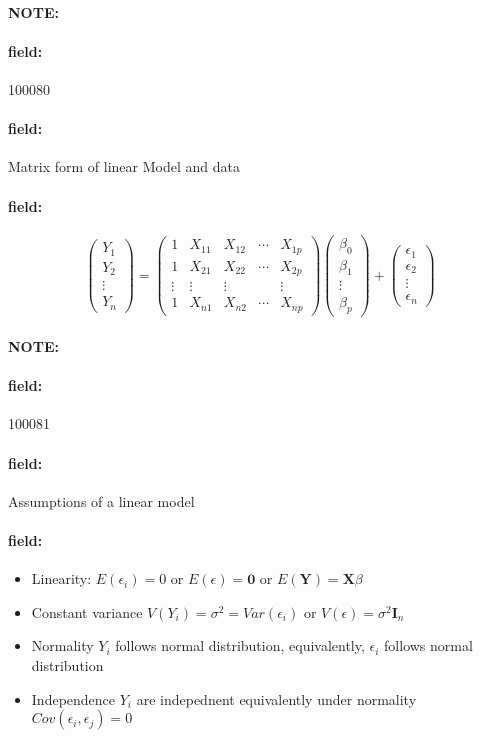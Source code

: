 \documentclass[12pt]{article}
\newenvironment{note}{\paragraph{NOTE:}}{}
\newenvironment{field}{\paragraph{field:}}{}
\begin{document}
\begin{note} \begin{field} \tiny 100080 \end{field}
 \begin{field}
  Matrix form of linear Model and data
 \end{field}
 \begin{field}
  $$ \begin{pmatrix}
    Y_1 \\ Y_2 \\ \vdots \\ Y_n
   \end{pmatrix}  = \begin{pmatrix}
    1      & X_{11} & X_{12} & \cdots & X_{1p} \\
    1      & X_{21} & X_{22} & \cdots & X_{2p} \\
    \vdots & \vdots & \vdots &        & \vdots \\
    1      & X_{n1} & X_{n2} & \cdots & X_{np}
   \end{pmatrix} \begin{pmatrix}
    \beta_0 \\ \beta_1 \\ \vdots \\ \beta_p
   \end{pmatrix} + \begin{pmatrix}
    \epsilon_1 \\ \epsilon_2 \\ \vdots \\ \epsilon_n
   \end{pmatrix}$$
 \end{field}
\end{note}


\begin{note} \begin{field} \tiny 100081 \end{field}
 \begin{field}
  Assumptions of a linear model
 \end{field}
 \begin{field}
  \begin{itemize}
   \item Linearity: $E(\epsilon_i) = 0$ or $E(\epsilon) = \mathbf{0}$ or $E(\mathbf{Y}) = \mathbf{X}\beta$
   \item Constant variance $V(Y_i) = \sigma^2 = Var(\epsilon_i)$ or $V(\epsilon) = \sigma^2 \mathbf{I}_n$
   \item Normality $Y_i$ follows normal distribution, equivalently, $\epsilon_i$ follows normal distribution
   \item Independence $Y_i$ are indepednent equivalently under normality $Cov(\epsilon_i, \epsilon_j) = 0$
  \end{itemize}
 \end{field}
\end{note}
\end{document}
